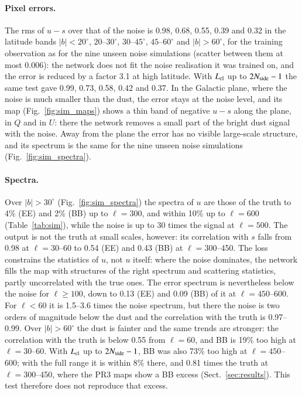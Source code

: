 \documentclass{aa}
\newcommand{\nside}{N_{\rm side}}
\begin{document}
\paragraph{Pixel errors.} The rms of $u-s$ over that of the noise is 0.98, 0.68, 0.55, 0.39 and 0.32 in the latitude bands $|b|<20^\circ$, $20$--$30^\circ$, $30$--$45^\circ$, $45$--$60^\circ$ and $|b|>60^\circ$, for the training observation as for the nine unseen noise simulations (scatter between them at most 0.006): the network does not fit the noise realisation it was trained on, and the error is reduced by a factor 3.1 at high latitude. With $L_{\rm cl}$ up to $2\nside-1$ the same test gave 0.99, 0.73, 0.58, 0.42 and 0.37. In the Galactic plane, where the noise is much smaller than the dust, the error stays at the noise level, and its map (Fig.~\ref{fig:sim_maps}) shows a thin band of negative $u-s$ along the plane, in $Q$ and in $U$: there the network removes a small part of the bright dust signal with the noise. Away from the plane the error has no visible large-scale structure, and its spectrum is the same for the nine unseen noise simulations (Fig.~\ref{fig:sim_spectra}).

\paragraph{Spectra.} Over $|b|>30^\circ$ (Fig.~\ref{fig:sim_spectra}) the spectra of $u$ are those of the truth to 4\% (EE) and 2\% (BB) up to $\ell=300$, and within 10\% up to $\ell=600$ (Table~\ref{tab:sim}), while the noise is up to 30 times the signal at $\ell=500$. The output is not the truth at small scales, however: its correlation with $s$ falls from 0.98 at $\ell=30$--60 to 0.54 (EE) and 0.43 (BB) at $\ell=300$--450. The loss constrains the statistics of $u$, not $u$ itself: where the noise dominates, the network fills the map with structures of the right spectrum and scattering statistics, partly uncorrelated with the true ones. The error spectrum is nevertheless below the noise for $\ell\ge100$, down to 0.13 (EE) and 0.09 (BB) of it at $\ell=450$--600. For $\ell<60$ it is 1.5--3.6 times the noise spectrum, but there the noise is two orders of magnitude below the dust and the correlation with the truth is 0.97--0.99. Over $|b|>60^\circ$ the dust is fainter and the same trends are stronger: the correlation with the truth is below 0.55 from $\ell=60$, and BB is 19\% too high at $\ell=30$--60. With $L_{\rm cl}$ up to $2\nside-1$, BB was also 73\% too high at $\ell=450$--600; with the full range it is within 8\% there, and 0.81 times the truth at $\ell=300$--450, where the PR3 maps show a BB excess (Sect.~\ref{sec:results}). This test therefore does not reproduce that excess.
\end{document}
